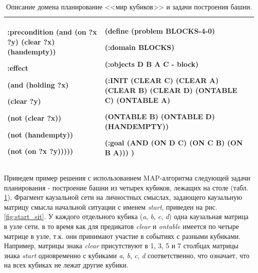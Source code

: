 \documentclass[12pt]{scrartcl}
\begin{document}
\begin{table}
\begin{tabular}{|p{}|p{}|p{}|}
				:precondition (and (on ?x ?y) (clear ?x) (handempty))
				
				:effect
				
				(and (holding ?x)
				
				(clear ?y)
				
				(not (clear ?x))
				
				(not (handempty))
				
				(not (on ?x ?y)))))
				&
				(define (\textbf{problem BLOCKS-4-0})
				
				(:domain BLOCKS)
				
				(:objects D B A C - block)
				
				(:INIT (CLEAR C) (CLEAR A) (CLEAR B) (CLEAR D) (ONTABLE C) (ONTABLE A)
				
				(ONTABLE B) (ONTABLE D) (HANDEMPTY))
				
				(:goal (AND (ON D C) (ON C B) (ON B A)))
				)\\
				\hline
			\end{tabular}
		\caption{Описание домена планирование <<мир кубиков>> и задачи построения башни.}
		\label{tab:domain}
	\end{table}

	Приведем пример решения с использованием MAP-алгоритма следующей задачи планирования - построение башни из четырех кубиков, лежащих на столе (табл. \ref{tab:domain}). Фрагмент каузальной сети на личностных смыслах, задающего каузальную матрицу смысла начальной ситуации с именем \textit{start}, приведен на рис. \ref{fig:start_sit}. У каждого отдельного кубика (\textit{a}, \textit{b}, \textit{c}, \textit{d}) одна каузальная матрица в узле сети, в то время как для предикатов \textit{clear} и \textit{ontable} имеется по четыре матрице в узле, т.к. они принимают участие в событиях с разными кубиками. Например, матрицы знака \textit{clear} присутствуют в 1, 3, 5 и 7 столбцах матрицы знака \textit{start} одновременно с кубиками \textit{a}, \textit{b}, \textit{c}, \textit{d} соответственно, что означает, что на всех кубиках не лежат другие кубики.
\end{document}

